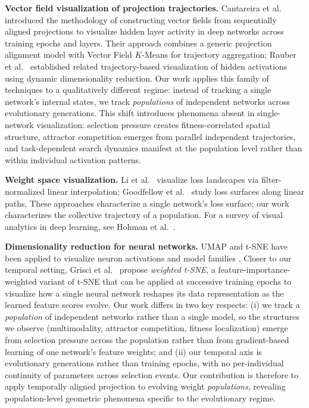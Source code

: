 \documentclass{article}
\begin{document}
\textbf{Vector field visualization of projection trajectories.}
Cantareira et al.\ \cite{cantareira2020exploring} introduced the
methodology of constructing vector fields from sequentially aligned
projections to visualize hidden layer activity in deep networks across
training epochs and layers. Their approach combines a generic projection
alignment model \cite{cantareira2020generic} with Vector Field
$K$-Means \cite{ferreira2013vector} for trajectory aggregation; Rauber
et al.\ \cite{rauber2016dynamic,rauber2017visualizing} established
related trajectory-based visualization of hidden activations using
dynamic dimensionality reduction. Our work applies this family of
techniques to a qualitatively different regime: instead of tracking a
single network's internal states, we track \emph{populations} of
independent networks across evolutionary generations. This shift
introduces phenomena absent in single-network visualization: selection
pressure creates fitness-correlated spatial structure, attractor
competition emerges from parallel independent trajectories, and
task-dependent search dynamics manifest at the population
level rather than within individual activation patterns.

\textbf{Weight space visualization.} Li et al.\ \cite{li2018visualizing}
visualize loss landscapes via filter-normalized linear interpolation;
Goodfellow et al.\ \cite{goodfellow2015qualitatively} study loss
surfaces along linear paths. These approaches characterize a single
network's loss surface; our work characterizes the collective trajectory
of a population. For a survey of visual analytics in deep learning, see
Hohman et al.\ \cite{hohman2018visual}.

\textbf{Dimensionality reduction for neural networks.} UMAP and t-SNE
have been applied to visualize neuron activations
\cite{carter2019activation} and model families \cite{rame2022diverse}.
Closer to our temporal setting, Grisci et al.\ \cite{grisci2025assessing}
propose \emph{weighted t-SNE}, a feature-importance-weighted variant
of t-SNE that can be applied at successive training epochs to visualize
how a single neural network reshapes its data representation as the
learned feature scores evolve. Our work differs in two key respects:
(i) we track a \emph{population} of independent networks rather than
a single model, so the structures we observe (multimodality, attractor
competition, fitness localization) emerge from selection pressure
across the population rather than from gradient-based learning of
one network's feature weights; and (ii) our temporal axis is
evolutionary generations rather than training epochs, with no
per-individual continuity of parameters across selection events.
Our contribution is therefore to apply temporally aligned projection
to evolving weight \emph{populations}, revealing population-level
geometric phenomena specific to the evolutionary regime.
\end{document}
